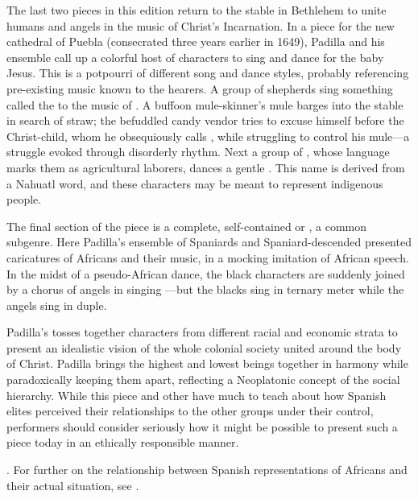 The last two pieces in this edition return to the stable in Bethlehem to unite humans and angels in the music of Christ's Incarnation.
In a piece for the new cathedral of Puebla (consecrated three years earlier in 1649), Padilla and his ensemble call up a colorful host of characters  to sing and dance for the baby Jesus.
This  is a potpourri of different song and dance styles, probably referencing pre-existing music known to the hearers.
A group of shepherds sing something called the  to the music of .
A buffoon mule-skinner's mule barges into the stable in search of straw; the befuddled candy vendor tries to excuse himself before the Christ-child, whom he obsequiously calls , while struggling to control his mule---a struggle evoked through disorderly rhythm.
Next a group of , whose language marks them as agricultural laborers, dances a gentle .
This name is derived from a Nahuatl word, and these characters may be meant to represent indigenous people.

The final section of the piece is a complete, self-contained  or , a common subgenre.
Here Padilla's ensemble of Spaniards and Spaniard-descended  presented caricatures of Africans and their music, in a mocking imitation of African speech.
In the midst of a pseudo-African dance, the black characters are suddenly joined by a chorus of angels in singing ---but the blacks sing in ternary meter while the angels sing in duple.

Padilla's  tosses together characters from different racial and economic strata to present an idealistic vision of the whole colonial society united around the body of Christ.
Padilla brings the highest and lowest beings together in harmony while paradoxically keeping them apart, reflecting a Neoplatonic concept of the social hierarchy.
While this piece and other  have much to teach about how Spanish elites perceived their relationships to the other groups under their control, performers should consider seriously how it might be possible to present such a piece today in an ethically responsible manner.%
  \begin{Footnote}
  \autocites{Baker:EthnicVC}{Baker:PerformancePostColonial}. 
  For further on the relationship between Spanish representations of Africans and their actual situation, see \autocites{Molinero:Negros}{Lipski:AfroHispanic}
  {Fromont:DancingKingCongo}.
  \end{Footnote}

